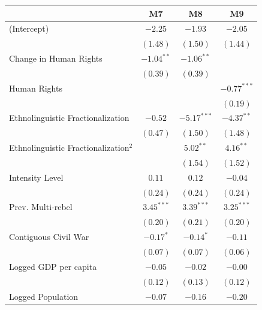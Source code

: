 \documentclass[12pt,]{book}
\let\origtable\table
\let\endorigtable\endtable
\renewenvironment{table}[1][2] {
    \singlespacing
    \expandafter\origtable\expandafter[H]
} {
    \endorigtable
}
\theoremstyle{definition}
\theoremstyle{definition}
\theoremstyle{definition}
\theoremstyle{remark}
\begin{document}
\begin{table}
\begin{center}
\begin{tabular}{l c c c }
\hline
 & M7 & M8 & M9 \\
\hline
(Intercept)                             & $-2.25$      & $-1.93$       & $-2.05$       \\
                                        & $(1.48)$     & $(1.50)$      & $(1.44)$      \\
Change in Human Rights                  & $-1.04^{**}$ & $-1.06^{**}$  &               \\
                                        & $(0.39)$     & $(0.39)$      &               \\
Human Rights                            &              &               & $-0.77^{***}$ \\
                                        &              &               & $(0.19)$      \\
Ethnolinguistic Fractionalization       & $-0.52$      & $-5.17^{***}$ & $-4.37^{**}$  \\
                                        & $(0.47)$     & $(1.50)$      & $(1.48)$      \\
Ethnolinguistic Fractionalization$^{2}$ &              & $5.02^{**}$   & $4.16^{**}$   \\
                                        &              & $(1.54)$      & $(1.52)$      \\
Intensity Level                         & $0.11$       & $0.12$        & $-0.04$       \\
                                        & $(0.24)$     & $(0.24)$      & $(0.24)$      \\
Prev. Multi-rebel                       & $3.45^{***}$ & $3.39^{***}$  & $3.25^{***}$  \\
                                        & $(0.20)$     & $(0.21)$      & $(0.20)$      \\
Contiguous Civil War                    & $-0.17^{*}$  & $-0.14^{*}$   & $-0.11$       \\
                                        & $(0.07)$     & $(0.07)$      & $(0.06)$      \\
Logged GDP per capita                   & $-0.05$      & $-0.02$       & $-0.00$       \\
                                        & $(0.12)$     & $(0.13)$      & $(0.12)$      \\
Logged Population                       & $-0.07$      & $-0.16$       & $-0.20$       \\

\end{tabular}
\end{center}
\end{table}
\end{document}

